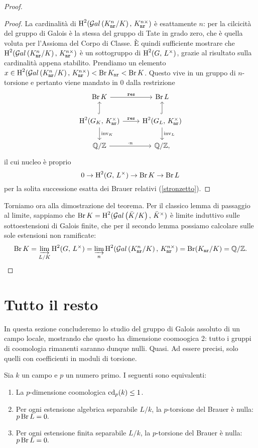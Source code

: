 \begin{proof}
\begin{proof}
	La cardinalità di $ \operatorname{H}^2(\mathcal{G}al\left( K_\mathtt{nr}^n/K \right),\, K_\mathtt{nr}^{n\times}) $ è esattamente $ n $: per la cilcicità del gruppo di Galois è la stessa del gruppo di Tate in grado zero, che è quella voluta per l'Assioma del Corpo di Classe. È quindi sufficiente mostrare che $ \operatorname{H}^2(\mathcal{G}al\left( K_\mathtt{nr}^n/K \right),\, K_\mathtt{nr}^{n\times}) $ è un sottogruppo di $ \operatorname{H}^2(G,\, L^\times ) $, grazie al risultato sulla cardinalità appena stabilito.
	Prendiamo un elemento $ x \in \operatorname{H}^2(\mathcal{G}al\left( K_\mathtt{nr}^n/K \right),\, K_\mathtt{nr}^{n\times}) < \operatorname{Br} K_\mathtt{nr} < \operatorname{Br} K $. Questo vive in un gruppo di $ n $-torsione e pertanto viene mandato in $ 0 $ dalla restrizione
	\[ \begin{tikzcd}
	\Br \K \rar["\Res"]
	& \Br L \\
	\HH^2(G_\K, \, \knr^\times) \rar["\Res"] \dar["\inv_\K"] \arrow[hook]{u}
	& \HH^2(G_L, \, \knr^\times) \dar["\inv_L"] \arrow[hook]{u} \\
	\Q/\Z \rar["\cdot n"]
	& \Q/\Z,
	\end{tikzcd} \]
	il cui nucleo è proprio
	\[ 0 \to \operatorname{H}^2(G, \, L^\times) \to \operatorname{Br} K \to \operatorname{Br} L \]
	per la solita successione esatta dei Brauer relativi (\ref{stronzetto}).
\end{proof}

Torniamo ora alla dimostrazione del teorema. Per il classico lemma di passaggio al limite, sappiamo che $ \operatorname{Br} K = \operatorname{H}^2(\mathcal{G}al\left( \bar{K}/K \right), \, \bar{K}^\times) $ è limite induttivo sulle sottoestensioni di Galois finite, che per il secondo lemma possiamo calcolare sulle sole estensioni non ramificate:
\[ \operatorname{Br} K = \varinjlim_{L/K} \operatorname{H}^2(G, \, L^\times) = \varinjlim_{n} \operatorname{H}^2(\mathcal{G}al\left( K_\mathtt{nr}^n/K \right),\, K_\mathtt{nr}^{n\times}) = \operatorname{Br} (K_\mathtt{nr} /K) = \mathbb{Q}/\mathbb{Z}. \]

\end{proof}

\section{Tutto il resto}
In questa sezione concluderemo lo studio del gruppo di Galois assoluto di un campo locale, mostrando che questo ha dimensione coomoogica 2: tutto i gruppi di coomologia rimanenti saranno dunque nulli. Quasi. Ad essere precisi, solo quelli con coefficienti in moduli di torsione.

\begin{lemma}
	Sia $ k $ un campo e $ p $ un numero primo. I seguenti sono equivalenti:
	\begin{enumerate}
		\item La $ p $-dimensione coomologica $ \operatorname{cd}_p(k) \leq 1 $.
		\item Per ogni estensione algebrica separabile $ L/k $, la $ p $-torsione del Brauer è nulla: $ p \operatorname{Br} L = 0. $
		\item Per ogni estensione finita separabile $ L/k $, la $ p $-torsione del Brauer è nulla: $ p \operatorname{Br} L = 0. $
	\end{enumerate}
\end{lemma}


